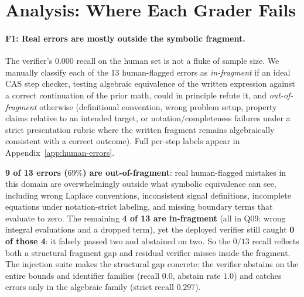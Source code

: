\section{Analysis: Where Each Grader Fails}
\label{sec:analysis}

\paragraph{F1: Real errors are mostly outside the symbolic fragment.}
The verifier's $0.000$ recall on the human set is not a fluke of sample size.
We manually classify each of the 13 human-flagged errors as
\emph{in-fragment} if an ideal CAS step checker, testing algebraic equivalence
of the written expression against a correct continuation of the prior math, could
in principle refute it, and \emph{out-of-fragment} otherwise (definitional
convention, wrong problem setup, property claims relative to an intended target,
or notation/completeness failures under a strict presentation rubric where the
written fragment remains algebraically consistent with a correct outcome).
Full per-step labels appear in Appendix~\ref{app:human-errors}.

\textbf{9 of 13 errors ($69\%$) are out-of-fragment}: real human-flagged
mistakes in this domain are overwhelmingly outside what symbolic equivalence
can see, including wrong Laplace conventions, inconsistent signal definitions,
incomplete equations under notation-strict labeling, and missing boundary terms
that evaluate to zero.
The remaining \textbf{4 of 13 are in-fragment} (all in Q09: wrong integral
evaluations and a dropped term), yet the deployed verifier still caught
\textbf{0 of those 4}: it falsely passed two and abstained on two. So the
$0/13$ recall reflects both a structural fragment gap and residual verifier
misses inside the fragment. The injection suite makes the structural gap
concrete: the verifier abstains on the entire bounds and identifier families
(recall $0.0$, abstain rate $1.0$) and catches errors only in the algebraic
family (strict recall $0.297$).

